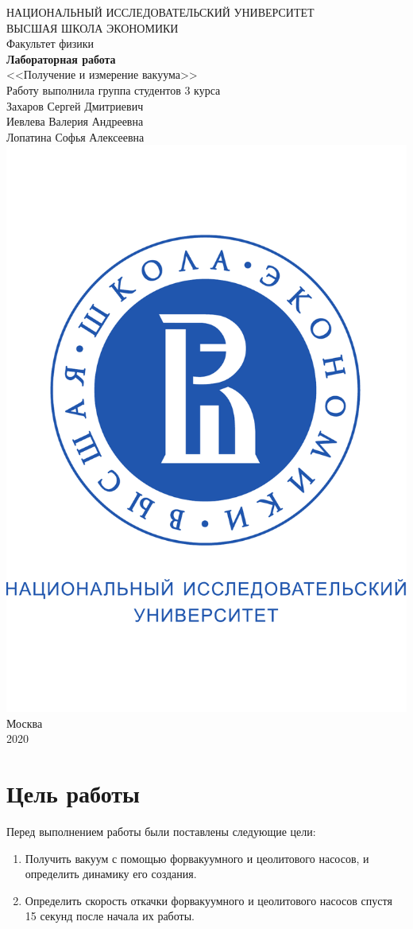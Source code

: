 \documentclass[a4paper, 12pt]{article}
\begin{document}
	\begin{titlepage}
		\begin{center}
			$$$$
			$$$$
			$$$$
			$$$$
			{\Large{НАЦИОНАЛЬНЫЙ ИССЛЕДОВАТЕЛЬСКИЙ УНИВЕРСИТЕТ}}\\
			\vspace{0.1cm}
			{\Large{ВЫСШАЯ ШКОЛА ЭКОНОМИКИ}}\\
			\vspace{0.25cm}
			{\large{Факультет физики}}\\
			\vspace{4cm}
			{\Huge\textbf{{Лабораторная работа}}}\\%
			\vspace{1cm}
			{\LARGE{<<Получение и измерение вакуума>>}}\\%
			\vspace{2cm}
			{Работу выполнила группа студентов 3 курса}\\
			{Захаров Сергей Дмитриевич \\
			Иевлева Валерия Андреевна\\
			Лопатина Софья Алексеевна}
			\vfill
			\includegraphics[width=0.2\linewidth]{HSElogo}
			\vfill
			Москва\\
			2020
		\end{center}
	\end{titlepage}

\tableofcontents

\section{Цель работы}

Перед выполнением работы были поставлены следующие цели:

\begin{enumerate}
	\item Получить вакуум с помощью форвакуумного и цеолитового насосов, и определить динамику его создания.
	
	\item Определить скорость откачки форвакуумного и цеолитового насосов спустя 15 секунд после начала их работы.
\end{enumerate}
\end{document}
